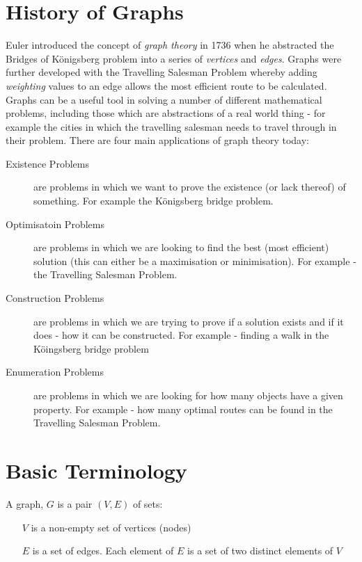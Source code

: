 
\section{History of Graphs}
Euler introduced the concept of \textit{graph theory} in 1736 when he abstracted the Bridges of K\"{o}nigsberg problem into a series of \textit{vertices} and \textit{edges}. Graphs were further developed with the Travelling Salesman Problem whereby adding \textit{weighting} values to an edge allows the most efficient route to be calculated.\\

Graphs can be a useful tool in solving a number of different mathematical problems, including those which are abstractions of a real world thing - for example the cities in which the travelling salesman needs to travel through in their problem. There are four main applications of graph theory today:
\begin{description}
    \item[Existence Problems] are problems in which we want to prove the existence (or lack thereof) of something. For example the K\"{o}nigsberg bridge problem.
    \item[Optimisatoin Problems] are problems in which we are looking to find the best (most efficient) solution (this can either be a maximisation or minimisation). For example - the Travelling Salesman Problem.
    \item[Construction Problems] are problems in which we are trying to prove if a solution exists and if it does - how it can be constructed. For example - finding a walk in the K\"{o}ingsberg bridge problem
    \item[Enumeration Problems] are problems in which we are looking for how many objects have a given property. For example - how many optimal routes can be found in the Travelling Salesman Problem.   
\end{description}

\section{Basic Terminology}
A graph, $G$ is a pair $(V, E)$ of sets:
\begin{itemize}
    \item[$V$] is a non-empty set of vertices (nodes)
    \item[$E$] is a set of edges. Each element of $E$ is a set of two distinct elements of $V$
\end{itemize}


